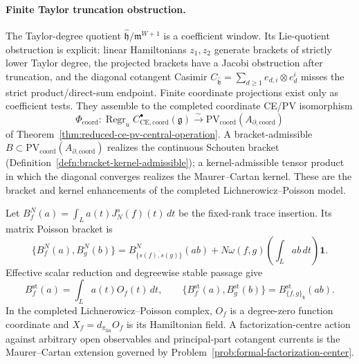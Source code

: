 \documentclass[11pt]{memoir}
\begin{document}
\paragraph{Finite Taylor truncation obstruction.}
The Taylor-degree quotient
\(\widehat{\mathfrak h}/\mathfrak m^{W+1}\) is a coefficient window.
Its Lie-quotient obstruction is explicit: linear Hamiltonians
\(z_1,z_2\) generate brackets of strictly lower Taylor degree, the
projected brackets have a Jacobi obstruction after truncation, and the diagonal cotangent Casimir
\(C_{\widehat{\mathfrak h}}=\sum_{d\ge1}e_{d,i}\otimes e^i_d\) misses
the strict product/direct-sum endpoint.  Finite coordinate projections
exist only as coefficient tests.  They assemble to the completed
coordinate CE/PV isomorphism
\[
  \Phi_{\mathrm{coord}}\colon
  \operatorname{Regr}_u
  C^\bullet_{\mathrm{CE},\mathrm{coord}}(\mathfrak g)
  \xrightarrow{\sim}
  \mathrm{PV}_{\mathrm{coord}}(A_{\partial,\mathrm{coord}})
\]
of Theorem~\ref{thm:reduced-ce-pv-central-operation}.  A
bracket-admissible
\(B\subset\mathrm{PV}_{\mathrm{coord}}(A_{\partial,\mathrm{coord}})\)
realizes the continuous Schouten bracket
(Definition~\ref{defn:bracket-kernel-admissible}); a kernel-admissible
tensor product in which the diagonal converges realizes the
Maurer--Cartan kernel.  These are the bracket and kernel enhancements of
the completed Lichnerowicz--Poisson model.

\begin{thm}
  \label{thm:witten-centrality-local-form}
  Let \(B^N_f(a)=\int_La(t)J_N^s(f)(t)\,dt\) be the fixed-rank trace
  insertion.  Its matrix Poisson bracket is
  \begin{equation}\label{eq:moment-centrality}
    \{B^N_f(a),B^N_g(b)\}
    =B^N_{\overline{\{s(f),s(g)\}}}(ab)
      +N\omega(f,g)\!\left(\int_Lab\,dt\right)\mathbf1.
  \end{equation}
  Effective scalar reduction and degreewise stable passage give
  \[
    B_f^{\mathrm{st}}(a)=\int_La(t)O_f(t)\,dt,
    \qquad
    \{B_f^{\mathrm{st}}(a),B_g^{\mathrm{st}}(b)\}
    =B_{\{f,g\}_{\mathfrak h}}^{\mathrm{st}}(ab).
  \]
  In the completed Lichnerowicz--Poisson complex, \(O_f\) is a
  degree-zero function coordinate and
  \(X_f=d_{\pi_{\mathrm{lin}}}O_f\) is its Hamiltonian field.  A
  factorization-centre action against arbitrary open observables and
  principal-part cotangent currents is the Maurer--Cartan extension
  governed by Problem~\ref{prob:formal-factorization-center}.
\end{thm}
\end{document}
